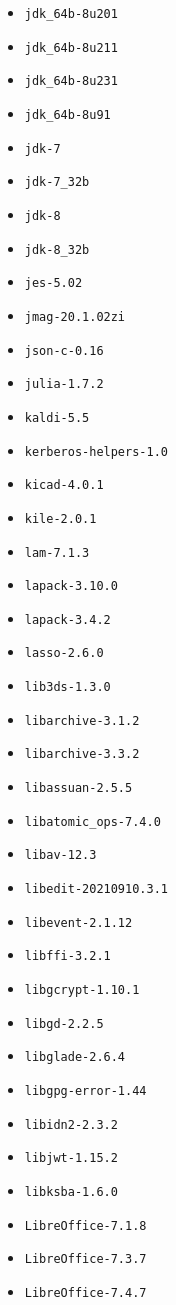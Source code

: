 \begin{multicols}{3}
\begin{itemize}
\item \verb|jdk_64b-8u201|
\item \verb|jdk_64b-8u211|
\item \verb|jdk_64b-8u231|
\item \verb|jdk_64b-8u91|
\item \verb|jdk-7|
\item \verb|jdk-7_32b|
\item \verb|jdk-8|
\item \verb|jdk-8_32b|
\item \verb|jes-5.02|
\item \verb|jmag-20.1.02zi|
\item \verb|json-c-0.16|
\item \verb|julia-1.7.2|
\item \verb|kaldi-5.5|
\item \verb|kerberos-helpers-1.0|
\item \verb|kicad-4.0.1|
\item \verb|kile-2.0.1|
\item \verb|lam-7.1.3|
\item \verb|lapack-3.10.0|
\item \verb|lapack-3.4.2|
\item \verb|lasso-2.6.0|
\item \verb|lib3ds-1.3.0|
\item \verb|libarchive-3.1.2|
\item \verb|libarchive-3.3.2|
\item \verb|libassuan-2.5.5|
\item \verb|libatomic_ops-7.4.0|
\item \verb|libav-12.3|
\item \verb|libedit-20210910.3.1|
\item \verb|libevent-2.1.12|
\item \verb|libffi-3.2.1|
\item \verb|libgcrypt-1.10.1|
\item \verb|libgd-2.2.5|
\item \verb|libglade-2.6.4|
\item \verb|libgpg-error-1.44|
\item \verb|libidn2-2.3.2|
\item \verb|libjwt-1.15.2|
\item \verb|libksba-1.6.0|
\item \verb|LibreOffice-7.1.8|
\item \verb|LibreOffice-7.3.7|
\item \verb|LibreOffice-7.4.7|

\end{itemize}
\end{multicols}
